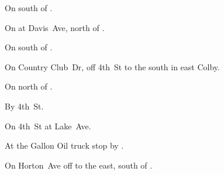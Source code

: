 

\begin{LocationList}

On  south of .

On  at Davis~Ave, north of .

On  south of .

On Country Club~Dr, off  4th~St to the south in east Colby.

On  north of .

By  4th~St.

On  4th~St at Lake~Ave.

At the Gallon Oil truck stop by  .

On Horton~Ave off  to the east, south of .

\end{LocationList}

